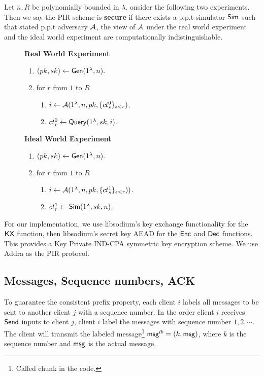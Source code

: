 \begin{definition}
\label{defn:pir-security}
Let $n, R$ be polynomially bounded in $\lambda$.  onsider the following two experiments. Then we say the PIR scheme is \textbf{secure} if there exists a p.p.t simulator $\mathsf{Sim}$ such that stated p.p.t adversary $\mathcal{A}$, the view of $\mathcal{A}$ under the real world experiment and the ideal world experiment are computationally indistinguishable. 
\begin{figure}[h!]
\begin{framed}
\textbf{Real World Experiment}
\begin{enumerate}
    \item $(pk, sk) \leftarrow \mathsf{Gen}(1^{\lambda}, n).$
    \item for $r$ from $1$ to $R$
    \begin{enumerate}
        \item $i \leftarrow \mathcal{A}(1^{\lambda}, n, pk, \{ct_s^0\}_{s < r})$.
        \item $ct_r^0 \leftarrow \mathsf{Query}(1^{\lambda}, sk, i)$.
    \end{enumerate}
\end{enumerate}
\textbf{Ideal World Experiment}
\begin{enumerate}
    \item $(pk, sk) \leftarrow \mathsf{Gen}(1^{\lambda}, n).$
    \item for $r$ from $1$ to $R$
    \begin{enumerate}
        \item $i \leftarrow \mathcal{A}(1^{\lambda}, n, pk, \{ct_s^1\}_{s < r}))$.
        \item $ct_r^1 \leftarrow \mathsf{Sim}(1^{\lambda}, sk, n)$.
    \end{enumerate}
\end{enumerate}
\end{framed}
\end{figure}
\end{definition}
For our implementation, we use libsodium's key exchange functionality for the $\mathsf{KX}$ function, then libsodium's secret key AEAD for the $\mathsf{Enc}$ and $\mathsf{Dec}$ functions. This provides a Key Private IND-CPA symmetric key encryption scheme. We use Addra as the PIR protocol.
\subsection{Messages, Sequence numbers, ACK}
To guarantee the consistent prefix property, each client $i$ labels all messages to be sent to another client $j$ with a sequence number. In the order client $i$ receives $\mathsf{Send}$ inputs to client $j$, client $i$ label the messages with sequence number $1,2,\cdots$. The client will transmit the labeled message\footnote{Called chunk in the code.} $\mathsf{msg}^{lb} = (k, \mathsf{msg})$, where $k$ is the sequence number and $\mathsf{msg}$ is the actual message. 

